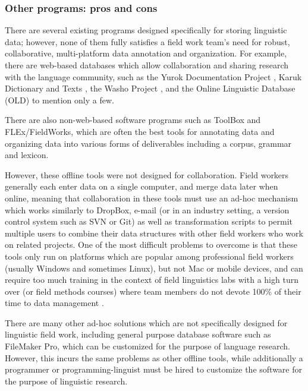 \documentclass[letterpaper, 12pt, dvips]{mitwpl}
\begin{document}
\subsubsection{Other programs: pros and cons}


There are several existing programs designed specifically for storing linguistic data; however,
none of them fully satisfies a field work team's need for robust,
collaborative,
multi-platform data annotation and organization.
For example,
there are web-based databases which allow collaboration and sharing research with the language community,
such as 
the Yurok Documentation Project \citep{Yurok:2001:Online},
 Karuk Dictionary and Texts \citep{Karuk:2009:Online},
the Washo Project \citep{Washo:2005:Online, WashoMobile:2008:Online, Cihlar:2008}, 
and the Online Linguistic Database (OLD) \citep{OLD:2010:Online} to mention only a few. 

There are also non-web-based software programs such as ToolBox \citep{ToolBox:2003:Online} 
and FLEx/FieldWorks,
\citep{FLEx:2011:Online}
which are often the best tools for annotating
data and organizing data into various forms of deliverables  
including a corpus,
grammar and lexicon.

However, these offline tools were not designed for collaboration. 
Field workers generally each enter data on a single computer,
and merge data later when online,
 meaning that collaboration in these tools must use an ad-hoc mechanism which works similarly to DropBox, e-mail (or in an industry setting, a version control system such as SVN or Git)
as well as transformation scripts to permit multiple users to combine their data structures with other field workers who work on related projects.
One of the most difficult problems to overcome is that 
these tools only run on platforms which are popular among professional field workers  (usually Windows and sometimes Linux), but 
not Mac or mobile devices, and can require too much training in the context of field linguistics labs with a high turn over (or field methods courses) where team members do not devote 100\% of their time to data management \citep{Butler:2007}.

There are many other ad-hoc solutions which are not specifically designed for linguistic field work, including general purpose database software such as FileMaker Pro,
which can be customized for the purpose of language research.
However,
this incurs the same problems as other offline tools,
while additionally a programmer or programming-linguist must be hired to customize the software for the purpose of linguistic research.
\end{document}
